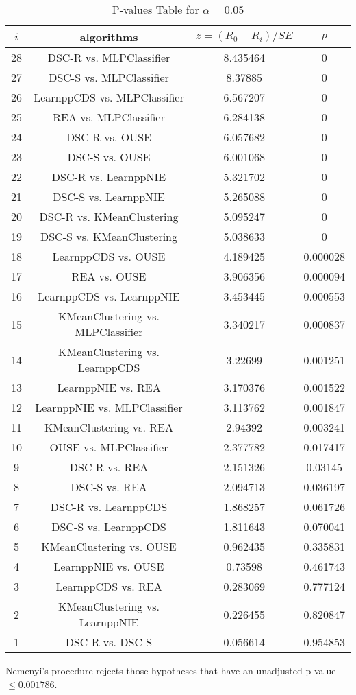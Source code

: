 \documentclass[a4paper,10pt]{article}
\begin{document}
\begin{landscape}
\begin{table}[!htp]
\centering\scriptsize
\begin{tabular}{cccc}
$i$&algorithms&$z=(R_0 - R_i)/SE$&$p$\\
\hline28&DSC-R vs. MLPClassifier&8.435464&0\\
27&DSC-S vs. MLPClassifier&8.37885&0\\
26&LearnppCDS vs. MLPClassifier&6.567207&0\\
25&REA vs. MLPClassifier&6.284138&0\\
24&DSC-R vs. OUSE&6.057682&0\\
23&DSC-S vs. OUSE&6.001068&0\\
22&DSC-R vs. LearnppNIE&5.321702&0\\
21&DSC-S vs. LearnppNIE&5.265088&0\\
20&DSC-R vs. KMeanClustering&5.095247&0\\
19&DSC-S vs. KMeanClustering&5.038633&0\\
18&LearnppCDS vs. OUSE&4.189425&0.000028\\
17&REA vs. OUSE&3.906356&0.000094\\
16&LearnppCDS vs. LearnppNIE&3.453445&0.000553\\
15&KMeanClustering vs. MLPClassifier&3.340217&0.000837\\
14&KMeanClustering vs. LearnppCDS&3.22699&0.001251\\
13&LearnppNIE vs. REA&3.170376&0.001522\\
12&LearnppNIE vs. MLPClassifier&3.113762&0.001847\\
11&KMeanClustering vs. REA&2.94392&0.003241\\
10&OUSE vs. MLPClassifier&2.377782&0.017417\\
9&DSC-R vs. REA&2.151326&0.03145\\
8&DSC-S vs. REA&2.094713&0.036197\\
7&DSC-R vs. LearnppCDS&1.868257&0.061726\\
6&DSC-S vs. LearnppCDS&1.811643&0.070041\\
5&KMeanClustering vs. OUSE&0.962435&0.335831\\
4&LearnppNIE vs. OUSE&0.73598&0.461743\\
3&LearnppCDS vs. REA&0.283069&0.777124\\
2&KMeanClustering vs. LearnppNIE&0.226455&0.820847\\
1&DSC-R vs. DSC-S&0.056614&0.954853\\
\hline
\end{tabular}
\caption{P-values Table for $\alpha=0.05$}
\end{table}Nemenyi's procedure rejects those hypotheses that have an unadjusted p-value $\le0.001786$.


\end{landscape}
\end{document}
